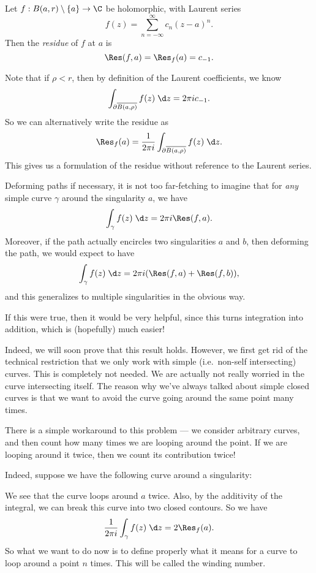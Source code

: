 \documentclass[a4paper]{article}
\begin{document}
\begin{defi}[Residue]
  Let $f: B (a, r) \setminus \{a\} \to \C$ be holomorphic, with Laurent series
  \[
    f(z) = \sum_{n = -\infty}^\infty c_n (z - a)^n.
  \]
  Then the \emph{residue} of $f$ at $a$ is
  \[
    \Res(f, a) = \Res_f(a) = c_{-1}.
  \]
\end{defi}
Note that if $\rho < r$, then by definition of the Laurent coefficients, we know
\[
  \int_{\partial \overline{B(a, \rho)}} f(z)\;\d z = 2\pi i c_{-1}.
\]
So we can alternatively write the residue as
\[
  \Res_f(a) = \frac{1}{2 \pi i}\int_{\partial \overline{B(a, \rho)}} f(z)\;\d z.
\]
This gives us a formulation of the residue without reference to the Laurent series.

Deforming paths if necessary, it is not too far-fetching to imagine that for \emph{any} simple curve $\gamma$ around the singularity $a$, we have
\[
  \int_{\gamma} f(z)\;\d z = 2\pi i\Res(f, a).
\]
Moreover, if the path actually encircles two singularities $a$ and $b$, then deforming the path, we would expect to have
\[
  \int_{\gamma} f(z)\;\d z = 2\pi i(\Res(f, a) + \Res(f, b)),
\]
and this generalizes to multiple singularities in the obvious way.

If this were true, then it would be very helpful, since this turns integration into addition, which is (hopefully) much easier!

Indeed, we will soon prove that this result holds. However, we first get rid of the technical restriction that we only work with simple (i.e.\ non-self intersecting) curves. This is completely not needed. We are actually not really worried in the curve intersecting itself. The reason why we've always talked about simple closed curves is that we want to avoid the curve going around the same point many times.

There is a simple workaround to this problem --- we consider arbitrary curves, and then count how many times we are looping around the point. If we are looping around it twice, then we count its contribution twice!

Indeed, suppose we have the following curve around a singularity:
\begin{center}
\end{center}
We see that the curve loops around $a$ twice. Also, by the additivity of the integral, we can break this curve into two closed contours. So we have
\[
  \frac{1}{2\pi i} \int_\gamma f(z)\;\d z = 2 \Res_f(a).
\]
So what we want to do now is to define properly what it means for a curve to loop around a point $n$ times. This will be called the winding number.
\end{document}
